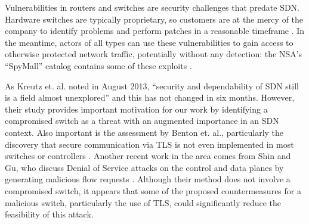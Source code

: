 Vulnerabilities in routers and switches are security challenges that predate SDN.  Hardware switches are typically proprietary, so customers are at the mercy of the company to identify problems and perform patches in a reasonable timeframe \cite{cisco}\cite{ciscopatch}.  In the meantime, actors of all types can use these vulnerabilities to gain access to otherwise protected network traffic, potentially without any detection: the NSA's ``SpyMall'' catalog contains some of these exploits \cite{spymall}.

As Kreutz et. al. noted in August 2013, ``security and dependability of SDN still is a field almost unexplored'' \cite{sdnsec} and this has not changed in six months.  However, their study provides important motivation for our work by identifying a compromised switch as a threat with an augmented importance in an SDN context.  Also important is the assessment by Benton et. al., particularly the discovery that secure communication via TLS is not even implemented in most switches or controllers \cite{benton}.  Another recent work in the area comes from Shin and Gu, who discuss Denial of Service attacks on the control and data planes by generating malicious flow requests \cite{attacking}.  Although their method does not involve a compromised switch, it appears that some of the proposed countermeasures for a malicious switch, particularly the use of TLS, could significantly reduce the feasibility of this attack.
